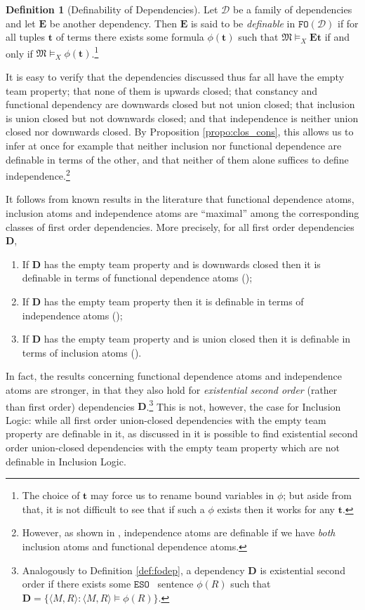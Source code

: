 \documentclass{article}
\theoremstyle{definition}
\newtheorem{Definition}[Theorem]{Definition}
\newcommand{\tuple}{\mathbf}
\newcommand{\FO}{\texttt{FO}}
\newcommand{\ESO}{\texttt{ESO}}
\newcommand{\M}{\mathfrak M}
\newcommand{\D}{\mathbf D}
\newcommand{\DD}{\mathcal D}
\newcommand{\E}{\mathbf E}
\begin{document}
\begin{Definition}[Definability of Dependencies]
Let $\DD$ be a family of dependencies and let $\E$ be another dependency. Then $\E$ is said to be \emph{definable} in $\FO(\DD)$ if for all tuples $\tuple t$ of terms there exists some formula $\phi(\tuple t)$ such that $\M \models_X \E \tuple t$ if and only if $\M \models_X \phi(\tuple t)$.\footnote{The choice of $\tuple t$ may force us to rename bound variables in $\phi$; but aside from that, it is not difficult to see that if such a $\phi$ exists then it works for any $\tuple t$.}
\label{def:def}
\end{Definition}
It is easy to verify that the dependencies discussed thus far all have the empty team property; that none of them is upwards closed; that constancy and functional dependency are downwards closed but not union closed; that inclusion is union closed but not downwards closed; and that independence is neither union closed nor downwards closed. By Proposition \ref{propo:clos_cons}, this allows us to infer at once for example that neither inclusion nor functional dependence are definable in terms of the other, and that neither of them alone suffices to define independence.\footnote{However, as shown in \cite{galliani12}, independence atoms are definable if we have \emph{both} inclusion atoms and functional dependence atoms.}

It follows from known results in the literature that functional dependence atoms, inclusion atoms and independence atoms are ``maximal'' among the corresponding classes of first order dependencies. More precisely, for all first order dependencies $\D$,
\begin{enumerate}
\item If $\D$ has the empty team property and is downwards closed then it is definable in terms of functional dependence atoms (\cite{kontinenv09}); 
\item If $\D$ has the empty team property then it is definable in terms of independence atoms (\cite{galliani12}); 
\item If $\D$ has the empty team property and is union closed then it is definable in terms of inclusion atoms (\cite{gallhella13}). 
\end{enumerate} 
In fact, the results concerning functional dependence atoms and independence atoms are stronger, in that they also hold for \emph{existential second order} (rather than first order) dependencies $\D$.\footnote{Analogously to Definition \ref{def:fodep}, a dependency $\D$ is existential second order if there exists some $\ESO$~ sentence $\phi(R)$ such that $\D = \{\langle M, R\rangle : \langle M, R\rangle \models \phi(R)\}$.} This is not, however, the case for Inclusion Logic: while all first order union-closed dependencies with the empty team property are definable in it, as discussed in \cite{gallhella13} it is possible to find existential second order union-closed dependencies with the empty team property which are not definable in Inclusion Logic.
\end{document}
